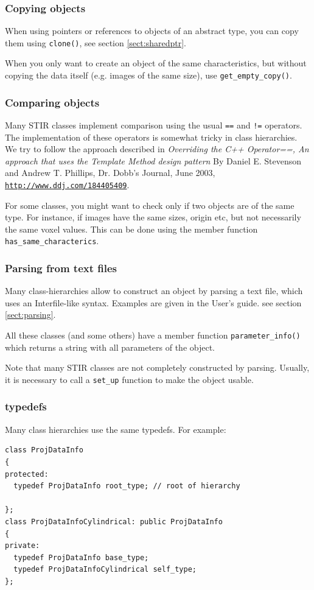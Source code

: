 \documentclass{article}
\def\R2Lurl#1#2{\mbox{\href{#1}{\tt #2}}}
\begin{document}
\subsubsection{Copying objects}
When using pointers or references to objects of an abstract type, you can copy 
them using \texttt{clone()}, see section \ref{sect:sharedptr}.


When you only want to create an object of the same characteristics, but without
copying the data itself (e.g. images of the same size), use \texttt{get\_empty\_copy()}.

\subsubsection{Comparing objects}
Many STIR classes implement comparison using the usual \texttt{==} and 
\texttt{!=} operators. The implementation of these operators is somewhat 
tricky in class hierarchies. We try to follow the approach described in
\textit{Overriding the C++ Operator==, An approach that uses the 
Template Method design pattern} By Daniel E. Stevenson and Andrew T. Phillips,
Dr. Dobb's Journal, June 2003, 
\R2Lurl{http://www.ddj.com/184405409}{http://www.ddj.com/184405409}.

For some classes, you might want to check only if two objects are of the same
type. For instance, if images have the same sizes, origin etc, but not 
necessarily the same voxel values. This can be done using the member
function \texttt{has\_same\_characterics}.

\subsubsection{Parsing from text files}
Many class-hierarchies allow to construct an object by parsing a 
text file, which uses an Interfile-like syntax. Examples
are given in the User's guide. see section \ref{sect:parsing}.

All these classes (and some others) have a member function 
\texttt{parameter\_info()} which returns a string with all parameters
of the object.

Note that many STIR classes are not completely constructed by parsing.
Usually, it is necessary to call a \texttt{set\_up} function to make
the object usable.

\subsubsection{typedefs}
Many class hierarchies use the same typedefs. For example:
\begin{verbatim}
class ProjDataInfo
{
protected:
  typedef ProjDataInfo root_type; // root of hierarchy
  
};
class ProjDataInfoCylindrical: public ProjDataInfo
{
private:
  typedef ProjDataInfo base_type;
  typedef ProjDataInfoCylindrical self_type;
};
\end{verbatim}
\end{document}
